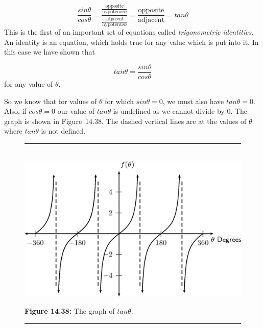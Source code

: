     \begin{equation}
    \frac{sin\theta }{cos\theta }=\frac{\frac{\mathrm{opposite}}{\mathrm{hypotenuse}}}{\frac{\mathrm{adjacent}}{\mathrm{hypotenuse}}}=\frac{\mathrm{opposite}}{\mathrm{adjacent}}=tan\theta \tag{14.36}
      \end{equation}
        \label{m39414*id89965}This is the first of an important set of equations called \textsl{trigonometric identities}. An identity is an equation, which holds true for any value which is put into it. In this case we have shown that\par 
        \label{m39414*id89978}\nopagebreak\noindent{}
          
    \begin{equation}
    tan\theta =\frac{sin\theta }{cos\theta }\tag{14.37}
      \end{equation}
        \label{m39414*id90014}for any value of $\theta $.\par 
        \label{m39414*id90030}So we know that for values of $\theta $ for which $sin\theta =0$, we must also have $tan\theta =0$. Also, if $cos\theta =0$ our value of $tan\theta $ is undefined as we cannot divide by 0. The graph is shown in Figure~14.38. The dashed vertical lines are at the values of $\theta $ where $tan\theta $ is not defined.\par 
    \setcounter{subfigure}{0}
	\begin{figure}[H] %
    \begin{center}
    \rule[.1in]{\figurerulewidth}{.005in} \\
        \label{m39414*uid71!!!underscore!!!media}\label{m39414*uid71!!!underscore!!!printimage}\includegraphics{col11306.imgs/m39414_MG10C15_044.png} %
      \vspace{2pt}
    \vspace{\rubberspace}\par \begin{cnxcaption}
	  \small \textbf{Figure 14.38: }The graph of $tan\theta $.
	\end{cnxcaption}
    \vspace{.1in}
    \rule[.1in]{\figurerulewidth}{.005in} \\
    \end{center}
 \end{figure}       
      \label{m39414*uid72}
